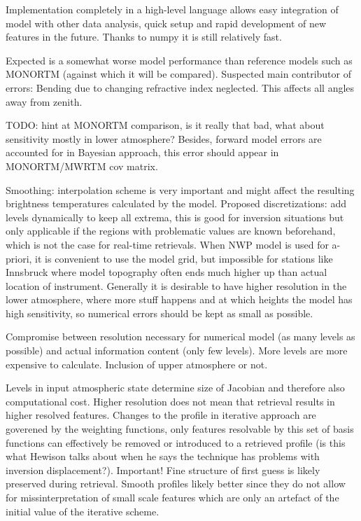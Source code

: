         Implementation completely in a high-level language allows easy
        integration of model with other data analysis, quick setup and rapid
        development of new features in the future. Thanks to numpy it is still
        relatively fast.

        Expected is a somewhat worse model performance than reference models
        such as MONORTM (against which it will be compared). Suspected main
        contributor of errors: Bending due to changing refractive index
        neglected. This affects all angles away from zenith. 

        TODO: hint at MONORTM comparison, is it really that bad, what about
        sensitivity mostly in lower atmosphere? Besides, forward model errors
        are accounted for in Bayesian approach, this error should appear in
        MONORTM/MWRTM cov matrix.
        
    \stopsubsection

    \startsubsection[title=Discretization and Interpolation]

        Smoothing: interpolation scheme is very important and might affect the
        resulting brightness temperatures calculated by the model. Proposed
        discretizations: add levels dynamically to keep all extrema, this is
        good for inversion situations but only applicable if the regions with
        problematic values are known beforehand, which is not the case for
        real-time retrievals. When NWP model is used for a-priori, it is
        convenient to use the model grid, but impossible for stations like
        Innsbruck where model topography often ends much higher up than
        actual location of instrument. Generally it is desirable to have higher
        resolution in the lower atmosphere, where more stuff happens and
        at which heights the model has high sensitivity, so numerical errors
        should be kept as small as possible.

        Compromise between resolution necessary for numerical model (as many
        levels as possible) and actual information content (only few levels).
        More levels are more expensive to calculate. Inclusion of upper
        atmosphere or not.

        Levels in input atmospheric state determine size of Jacobian and
        therefore also computational cost. Higher resolution does not mean
        that retrieval results in higher resolved features. Changes to the
        profile in iterative approach are goverened by the weighting functions,
        only features resolvable by this set of basis functions can effectively
        be removed or introduced to a retrieved profile (is this what Hewison
        talks about when he says the technique has problems with inversion
        displacement?). Important! Fine structure of first guess is likely
        preserved during retrieval. Smooth profiles likely better since they
        do not allow for missinterpretation of small scale features which are
        only an artefact of the initial value of the iterative scheme.

